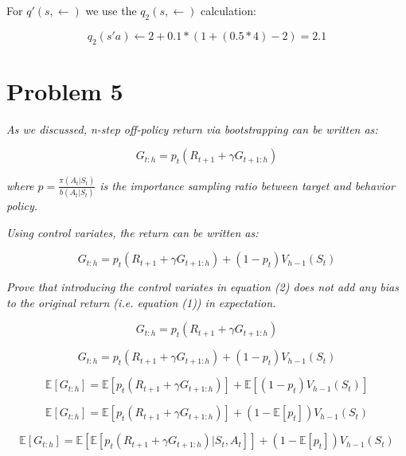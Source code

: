 \documentclass{article}
\begin{document}
For $q'(s,\leftarrow)$ we use the $q_2(s,\leftarrow)$ calculation:

\begin{equation}
    q_2(s'a) \leftarrow 2 + 0.1 * (1 + (0.5 * 4) - 2) = 2.1
\end{equation}


\section*{Problem 5}

\textit{As we discussed, n-step off-policy return via bootstrapping can be written as:}

\begin{equation}
    G_{t:h} = p_t(R_{t+1} + \gamma G_{t+1:h})
\end{equation}

\textit{where $p=\frac{\pi(A_t|S_t)}{b(A_t|S_t)}$ is the importance sampling ratio between target and behavior policy.}

\textit{Using control variates, the return can be written as:}

\begin{equation}
    G_{t:h} = p_t(R_{t+1}+\gamma G_{t+1:h}) + (1-p_t) V_{h-1} (S_t)
\end{equation}

\textit{Prove that introducing the control variates in equation (2) does not add any bias to the original return (i.e. equation (1)) in expectation.}

\begin{equation}
    G_{t:h} = p_t(R_{t+1} + \gamma G_{t+1:h})
\end{equation}

\begin{equation}
    G_{t:h} = p_t(R_{t+1}+\gamma G_{t+1:h}) + (1-p_t) V_{h-1} (S_t)
\end{equation}

\begin{equation}
    \mathbb{E}[G_{t:h}] = \mathbb{E}[p_t(R_{t+1} + \gamma G_{t+1:h})] + \mathbb{E}[(1-p_t) V_{h-1} (S_t)]
\end{equation}

\begin{equation}
    \mathbb{E}[G_{t:h}] = \mathbb{E}[p_t(R_{t+1} + \gamma G_{t+1:h})] + (1-\mathbb{E}[p_t]) V_{h-1} (S_t)
\end{equation}

\begin{equation}
    \mathbb{E}[G_{t:h}] = \mathbb{E}[\mathbb{E}[p_t(R_{t+1} + \gamma G_{t+1:h})|S_t,A_t]] + (1-\mathbb{E}[p_t]) V_{h-1} (S_t)
\end{equation}
\end{document}
